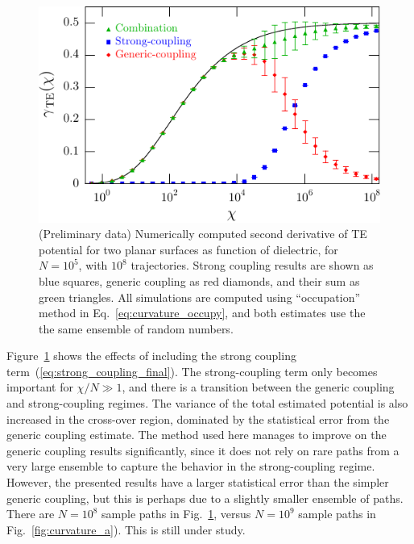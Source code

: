 \begin{figure}
  \centering
  \includegraphics[width=0.8\columnwidth]{fig/numerics/curvature_c}
  \caption[(Preliminary data) Numerical TE Potential Curvature for two planar surfaces, evaluated with strong-coupling methods]{
(Preliminary data) Numerically computed second derivative of TE potential for two planar surfaces as function 
    of dielectric, for $N=10^5$, with $10^8$ trajectories.
    Strong coupling results are shown as blue squares, generic coupling as red diamonds, 
    and their sum as green triangles.  
    All simulations are computed using
  ``occupation'' method in Eq.~\ref{eq:curvature_occupy}, and both estimates use the the same ensemble of random numbers.}
\label{fig:curvature_c}
\end{figure}

Figure~\ref{fig:curvature_c} shows the effects of including the strong coupling term~(\ref{eq:strong_coupling_final}).  
The strong-coupling term only becomes important for $\chi/N\gg 1$,
and there is a transition between the generic coupling and strong-coupling regimes. 
The variance of the total estimated potential is also increased in the cross-over region, 
dominated by the statistical error from the generic coupling estimate.  
The method used here manages to improve on the generic coupling results significantly, since 
it does not rely on rare paths from a very large ensemble to capture the behavior in the strong-coupling regime.
However, the presented results have a larger statistical error than the simpler generic coupling, but this is 
perhaps due to a slightly smaller ensemble of paths.  There are $N=10^8$ sample paths in Fig.~\ref{fig:curvature_c}, versus $N=10^9$ 
sample paths in Fig.~\ref{fig:curvature_a}).  This is
still under study.   

